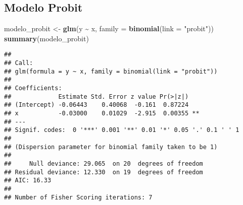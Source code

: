 \documentclass[
]{article}
\newenvironment{Shaded}{\begin{snugshade}}{\end{snugshade}}
\newcommand{\AttributeTok}[1]{\textcolor[rgb]{0.13,0.29,0.53}{#1}}
\newcommand{\FunctionTok}[1]{\textcolor[rgb]{0.13,0.29,0.53}{\textbf{#1}}}
\newcommand{\NormalTok}[1]{#1}
\newcommand{\OtherTok}[1]{\textcolor[rgb]{0.56,0.35,0.01}{#1}}
\newcommand{\SpecialCharTok}[1]{\textcolor[rgb]{0.81,0.36,0.00}{\textbf{#1}}}
\newcommand{\StringTok}[1]{\textcolor[rgb]{0.31,0.60,0.02}{#1}}
\begin{document}
\subsection{Modelo Probit}\label{modelo-probit}

\begin{Shaded}
\begin{Highlighting}[]
\NormalTok{modelo\_probit }\OtherTok{\textless{}{-}} \FunctionTok{glm}\NormalTok{(y }\SpecialCharTok{\textasciitilde{}}\NormalTok{ x, }\AttributeTok{family =} \FunctionTok{binomial}\NormalTok{(}\AttributeTok{link =} \StringTok{"probit"}\NormalTok{))}
\FunctionTok{summary}\NormalTok{(modelo\_probit)}
\end{Highlighting}
\end{Shaded}

\begin{verbatim}
## 
## Call:
## glm(formula = y ~ x, family = binomial(link = "probit"))
## 
## Coefficients:
##             Estimate Std. Error z value Pr(>|z|)   
## (Intercept) -0.06443    0.40068  -0.161  0.87224   
## x           -0.03000    0.01029  -2.915  0.00355 **
## ---
## Signif. codes:  0 '***' 0.001 '**' 0.01 '*' 0.05 '.' 0.1 ' ' 1
## 
## (Dispersion parameter for binomial family taken to be 1)
## 
##     Null deviance: 29.065  on 20  degrees of freedom
## Residual deviance: 12.330  on 19  degrees of freedom
## AIC: 16.33
## 
## Number of Fisher Scoring iterations: 7
\end{verbatim}
\end{document}
